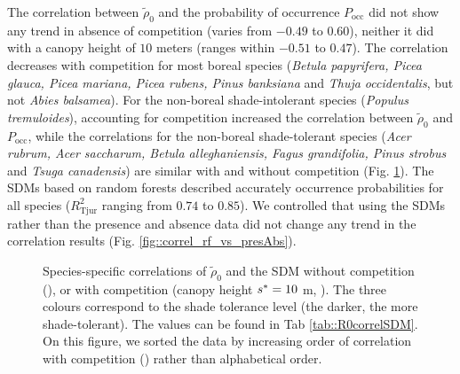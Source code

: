 The correlation between $ \tilde \rho_0 $ and the probability of occurrence $ P_{\text{occ}} $ did not show any trend in absence of competition (varies from $ - 0.49 $ to $ 0.60 $), neither it did with a canopy height of $ 10 $ meters (ranges within $ - 0.51 $ to $ 0.47 $). The correlation decreases with competition for most boreal species (\textit{Betula papyrifera, Picea glauca, Picea mariana, Picea rubens, Pinus banksiana} and \textit{Thuja occidentalis}, but not \textit{Abies balsamea}). For the non-boreal shade-intolerant species (\textit{Populus tremuloides}), accounting for competition increased the correlation between $ \tilde \rho_0 $ and $ P_{\text{occ}} $, while the correlations for the non-boreal shade-tolerant species (\textit{Acer rubrum, Acer saccharum, Betula alleghaniensis, Fagus grandifolia, Pinus strobus} and \textit{Tsuga canadensis}) are similar with and without competition (Fig. \ref{fig::3correls}). The SDMs based on random forests described accurately occurrence probabilities for all species ($ R_{\text{Tjur}}^2 $ ranging from $ 0.74 $ to $ 0.85 $). We controlled that using the SDMs rather than the presence and absence data did not change any trend in the correlation results (Fig. \ref{fig::correl_rf_vs_presAbs}).
\begin{figure}
	\centering
	
	\caption{Species-specific correlations of $ \tilde \rho_0 $ and the SDM without competition (\MoveUp), or with competition (canopy height $ {s}^{*} = 10 $ m, \CircSteel). The three colours correspond to the shade tolerance level (the darker, the more shade-tolerant). The values can be found in Tab \ref{tab::R0correlSDM}. On this figure, we sorted the data by increasing order of correlation with competition (\CircSteel) rather than alphabetical order. \label{fig::3correls}}
\end{figure}
